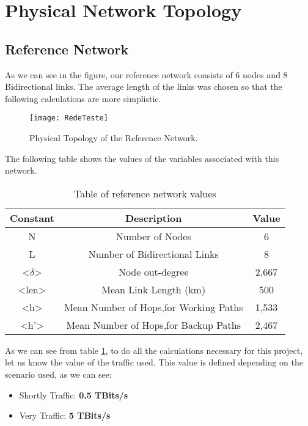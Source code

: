 \section{Physical Network Topology}

\subsection{Reference Network}
As we can see in the figure, our reference network consists of 6 nodes and 8 Bidirectional links.
The average length of the links was chosen so that the following calculations are more simplistic.

\begin{figure}[h!]
\centering
\texttt{[image: RedeTeste]}
\caption{Physical Topology of the Reference Network.}
\end{figure}

\vspace{10pt}

The following table shows the values of the variables associated with this network.
\begin{table}[h!]
\vspace{10pt}
\centering
\begin{tabular}{|| c | c | c||}
 \hline
 Constant & Description & Value \\
 \hline\hline
 N & Number of Nodes & 6 \\
 L & Number of Bidirectional Links & 8 \\
 <$\delta$> & Node out-degree & 2,667 \\
 <len> & Mean Link Length (km) & 500 \\
 <h> & Mean Number of Hops,for Working Paths & 1,533 \\
 <h'> & Mean Number of Hops,for Backup Paths & 2,467 \\
 \hline
\end{tabular}
\caption{Table of reference network values}
\label{table:1}
\end{table}
\vspace{10pt}

As we can see from table \ref{table:1}, to do all the calculations necessary for this project, let us know the value of the traffic used. This value is defined depending on the scenario used, as we can see:
\begin{itemize}
  \item Shortly Traffic: \textbf{0.5 TBits/s}
  \item Very Traffic: \textbf{5 TBits/s}
\end{itemize}
\vspace{10pt}

